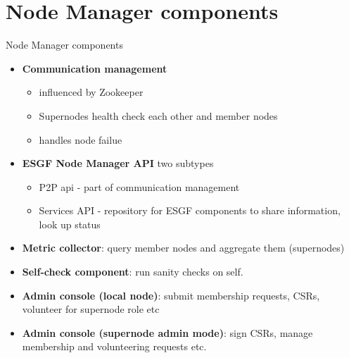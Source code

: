 \documentclass{beamer}
\begin{document}
\section{Node Manager components}
\begin{frame}{Node Manager components}
\begin{itemize}

\item \textbf{Communication management}
\begin{itemize}
\item influenced by Zookeeper
\item Supernodes health check each other and member nodes
\item handles node failue
\end{itemize}


\item \textbf{ESGF Node Manager API} two subtypes
\begin{itemize}
\item P2P api - part of communication management
\item Services API - repository for ESGF components to share information, look up status
\end{itemize}


\item \textbf{Metric collector}: query member nodes and aggregate them (supernodes)
\item \textbf{Self-check component}: run sanity checks on self.



\item \textbf{Admin console (local node)}: submit membership requests, CSRs, volunteer for supernode role etc
\item \textbf{Admin console (supernode admin mode)}: sign CSRs, manage membership and volunteering requests etc. 
\end{itemize}
\end{frame}

%
%
%
\end{document}
